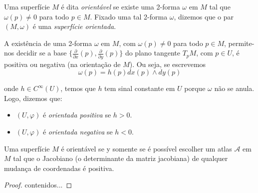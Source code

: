 \begin{defi}
	Uma superfície $M$ é dita \emph{orientável} se existe uma 2-forma $\omega$ em $M$ tal que $\omega(p) \neq 0$ para todo $p \in M$. Fixado uma tal 2-forma $\omega$, dizemos que o par $(M, \omega)$ é uma \emph{superfície orientada}.	
\end{defi}

A existência de uma 2-forma $\omega$ em $M$, com $\omega(p) \neq 0$ para todo $p \in M$, permite-nos decidir se a base $\{ \frac{\partial}{\partial x}(p), \frac{\partial}{\partial y}(p) \}$ do plano tangente $T_p M$, com $p \in U$, é positiva ou negativa (na orientação de $M$). Ou seja, se escrevemos
\begin{equation*}
	\omega(p) = h(p) dx(p) \wedge dy(p)
\end{equation*}

onde $h \in C^{\infty}(U)$, temos que $h$ tem sinal constante em $U$ porque $\omega$ não se anula. Logo, dizemos que:
\begin{itemize}
	\item $(U, \varphi)$ é \emph{orientada positiva} se $h >0$.
	\item $(U, \varphi)$ é \emph{orientada negativa} se $h<0$.
\end{itemize}

\begin{prop}
	Uma superfície $M$ é orientável se y somente se é possível escolher um atlas $\mathcal{A}$ em $M$ tal que o Jacobiano (o determinante da matriz jacobiana) de qualquer mudança de coordenadas é positiva.
\end{prop}

\begin{proof}
	contenidos...
\end{proof}